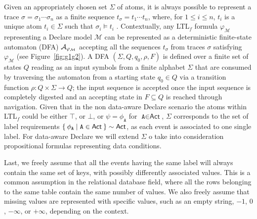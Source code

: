 Given an appropriately chosen set $\Sigma$ of atoms, it is always possible to represent a trace $\sigma=\sigma_1\cdots \sigma_n$ as a finite sequence $t_\sigma=t_1\cdots t_n$, where, for $1\leq i\leq n$, $t_i$ is a unique atom $t_i\in\Sigma$ such that $\sigma_i\vDash t_i$ \cite{XuLZ17a,MaggiMCA18}.
Contextually,  any LTL$_f$ formula $\varphi_{\mathcal{M}}$ representing a Declare model $\mathcal{M}$ can be represented as a deterministic finite-state automaton (DFA) $\mathcal{A}_{\varphi_{\tiny\mathcal{M}}}$ \cite{Westergaard11,Lydia} accepting all the sequences $t_\sigma$ from traces $\sigma$ satisfying $\varphi_{\mathcal{M}}$ (see Figure~\ref{fig:g1g2}). A DFA  $(\Sigma,Q,q_0,\rho,F)$ is defined \cite{0016921} over a finite set of states $Q$ reading as an input symbols from a finite alphabet $\Sigma$ that are consumed by traversing the automaton from a starting state $q_0\in Q$ via a transition function $\rho\colon Q\times \Sigma\to Q$; the input sequence is accepted once the input sequence is completely digested and an accepting state in $F\subseteq Q$ is reached through navigation. Given that in the non data-aware Declare scenario the atoms within LTL$_f$ could be either $\top$, or $\bot$, or $\psi=\phi_\texttt{A}$ for $\texttt{A}\in\textsf{Act}$, $\Sigma$ corresponds to the set of label requirements $\Set{\phi_\texttt{A}|\texttt{A}\in\textsf{Act}}\sim\textsf{Act}$, as each event is associated to one single label. For data-aware Declare we will extend $\Sigma$ o take into consideration propositional formulas representing data conditions.

Last, we freely assume that all the events having the same label will always contain the same set of keys, with possibly differently associated values. This is a common assumption in the relational database field, where all the rows belonging to the same table contain the same number of values. We also freely assume that missing values are represented with specific values, such as an empty string, $-1$, $0$, $-\infty$, or $+\infty$, depending on the context. 